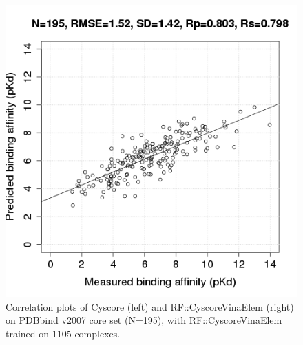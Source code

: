 \documentclass[journal=jacsat,manuscript=article]{achemso}
\begin{document}
\begin{figure}[h]
\includegraphics[width=1.4\linewidth,natwidth=480,natheight=480]{../rfcyscore/x46/rf/trn-1105-tst-195-yp.png}
\endminipage
\caption{Correlation plots of Cyscore (left) and RF::CyscoreVinaElem (right) on PDBbind v2007 core set (N=195), with RF::CyscoreVinaElem trained on 1105 complexes.}
\label{fig:tst195}
\end{figure}
\end{document}
